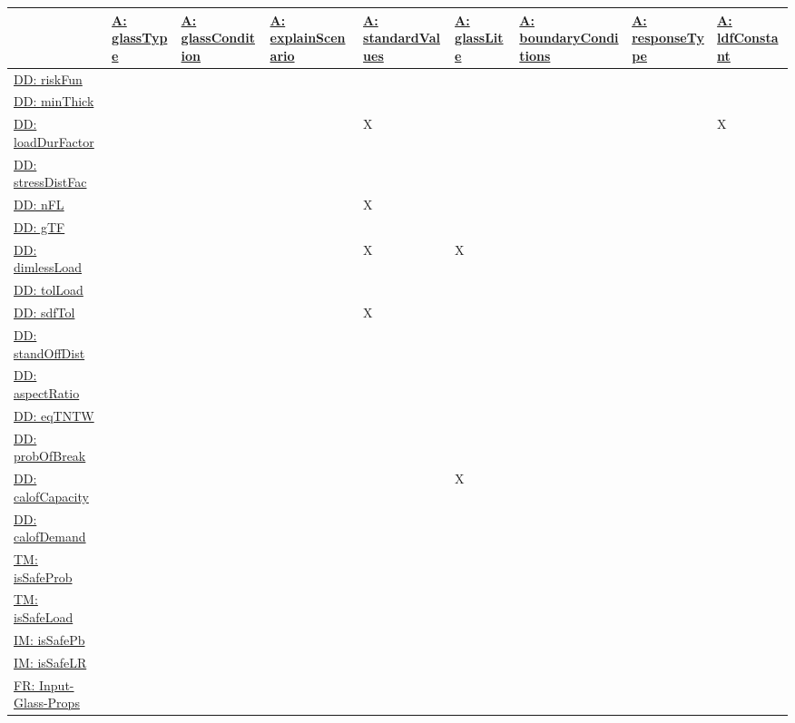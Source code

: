 \documentclass[12pt]{article}
\begin{document}
\begin{longtable}{l l l l l l l l l}
\toprule
 & \hyperref[assumpGT]{A: glassType} & \hyperref[assumpGC]{A: glassCondition} & \hyperref[assumpES]{A: explainScenario} & \hyperref[assumpSV]{A: standardValues} & \hyperref[assumpGL]{A: glassLite} & \hyperref[assumpBC]{A: boundaryConditions} & \hyperref[assumpRT]{A: responseType} & \hyperref[assumpLDFC]{A: ldfConstant}
\\
\midrule
\endhead
\hyperref[DD:riskFun]{DD: riskFun} &  &  &  &  &  &  &  & 
\\
\hyperref[DD:minThick]{DD: minThick} &  &  &  &  &  &  &  & 
\\
\hyperref[DD:loadDurFactor]{DD: loadDurFactor} &  &  &  & X &  &  &  & X
\\
\hyperref[DD:stressDistFac]{DD: stressDistFac} &  &  &  &  &  &  &  & 
\\
\hyperref[DD:nFL]{DD: nFL} &  &  &  & X &  &  &  & 
\\
\hyperref[DD:gTF]{DD: gTF} &  &  &  &  &  &  &  & 
\\
\hyperref[DD:dimlessLoad]{DD: dimlessLoad} &  &  &  & X & X &  &  & 
\\
\hyperref[DD:tolLoad]{DD: tolLoad} &  &  &  &  &  &  &  & 
\\
\hyperref[DD:sdfTol]{DD: sdfTol} &  &  &  & X &  &  &  & 
\\
\hyperref[DD:standOffDist]{DD: standOffDist} &  &  &  &  &  &  &  & 
\\
\hyperref[DD:aspectRatio]{DD: aspectRatio} &  &  &  &  &  &  &  & 
\\
\hyperref[DD:eqTNTW]{DD: eqTNTW} &  &  &  &  &  &  &  & 
\\
\hyperref[DD:probOfBreak]{DD: probOfBreak} &  &  &  &  &  &  &  & 
\\
\hyperref[DD:calofCapacity]{DD: calofCapacity} &  &  &  &  & X &  &  & 
\\
\hyperref[DD:calofDemand]{DD: calofDemand} &  &  &  &  &  &  &  & 
\\
\hyperref[TM:isSafeProb]{TM: isSafeProb} &  &  &  &  &  &  &  & 
\\
\hyperref[TM:isSafeLoad]{TM: isSafeLoad} &  &  &  &  &  &  &  & 
\\
\hyperref[IM:isSafePb]{IM: isSafePb} &  &  &  &  &  &  &  & 
\\
\hyperref[IM:isSafeLR]{IM: isSafeLR} &  &  &  &  &  &  &  & 
\\
\hyperref[inputGlassProps]{FR: Input-Glass-Props} &  &  &  &  &  &  &  & 
\\

\end{longtable}
\end{document}

